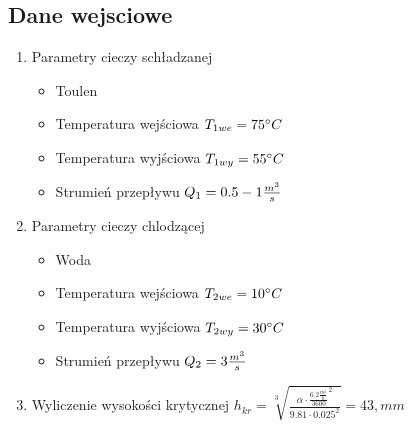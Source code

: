 \subsection{Dane wejsciowe}
    \begin{enumerate}
        \item 
            \begin{flushleft}
                Parametry cieczy schładzanej
                \begin{itemize}
                    \item Toulen
                    \item Temperatura wejściowa \(T_{1we} = 75^\circ C\)
                    \item Temperatura wyjściowa \(T_{1wy} = 55^\circ C\)
                    \item Strumień przepływu    \(Q_{1} = 0.5-1\frac{m^3}{s}\)
                \end{itemize}
            \end{flushleft} 
        \item 
            \begin{flushleft}
                Parametry cieczy chlodzącej
                \begin{itemize}
                    \item Woda
                    \item Temperatura wejściowa \(T_{2we} = 10^\circ C\)
                    \item Temperatura wyjściowa \(T_{2wy} = 30^\circ C\)
                    \item Strumień przepływu    \(Q_{2} = 3\frac{m^3}{s}\)
                \end{itemize}
            \end{flushleft} 
        \item 
            \begin{flushleft}
                Wyliczenie wysokości krytycznej
                \centering
                $ h_{kr}=\sqrt[3]{\frac{\alpha \cdot {\frac{6.2\frac{m^3}{h}}{3600}}^2}{9.81\cdot 0.025^2}}=43,mm$
            \end{flushleft} 
    \end{enumerate}
    

